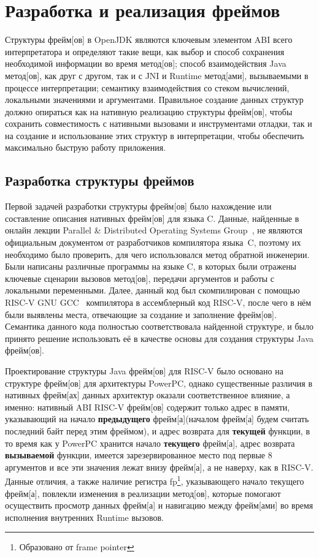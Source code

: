 \section{Разработка и реализация фреймов}

Структуры \gls{фрейм}[ов] в OpenJDK являются ключевым элементом ABI всего интерпретатора и определяют такие вещи, как выбор и способ сохранения необходимой информации во время  \gls{метод}[ов]; способ взаимодействия Java \gls{метод}[ов], как друг с другом, так и с JNI и Runtime \gls{метод}[ами], вызываемыми в процессе интерпретации; семантику взаимодействия со стеком вычислений, локальными значениями и аргументами. Правильное создание данных структур должно опираться как на нативную реализацию структуры \gls{фрейм}[ов], чтобы сохранить совместимость с нативными вызовами и инструментами отладки, так и на создание и использование этих структур в интерпретации, чтобы обеспечить максимально быструю работу приложения.


\subsection{Разработка структуры фреймов}

Первой задачей разработки структуры \gls{фрейм}[ов] было нахождение или составление описания нативных \gls{фрейм}[ов] для языка C. Данные, найденные в онлайн лекции Parallel \& Distributed Operating Systems Group~\cite{lecture:frames}, не являются официальным документом от разработчиков компилятора языка~C, поэтому их необходимо было проверить, для чего использовался \gls{метод} обратной инженерии. Были написаны различные программы на языке C, в которых были отражены ключевые сценарии вызовов \gls{метод}[ов], передачи аргументов и работы с локальными переменными. Далее, данный код был скомпилирован с помощью RISC-V GNU GCC~\cite{riscv:gnu} компилятора в ассемблерный код RISC-V, после чего в нём были выявлены места, отвечающие за создание и заполнение \gls{фрейм}[ов]. Семантика данного кода полностью соответствовала найденной структуре, и было принято решение использовать её в качестве основы для создания структуры Java \gls{фрейм}[ов]. 

Проектирование структуры Java \gls{фрейм}[ов] для RISC-V было основано на структуре \gls{фрейм}[ов] для архитектуры PowerPC, однако существенные различия в нативных \gls{фрейм}[ах] данных архитектур оказали соответственное влияние, а именно: нативный ABI RISC-V \gls{фрейм}[ов] содержит только адрес в памяти, указывающий на начало \textbf{предыдущего} \gls{фрейм}[а](началом \gls{фрейм}[а] будем считать последний байт перед этим фреймом), и адрес возврата для \textbf{текущей} функции, в то время как у PowerPC хранится начало \textbf{текущего} \gls{фрейм}[а], адрес возврата \textbf{вызываемой} функции, имеется зарезервированное место под первые 8 аргументов и все эти значения лежат внизу \gls{фрейм}[а], а не наверху, как в RISC-V.
Данные отличия, а также наличие регистра fp\footnote{Образовано от frame pointer}, указывающего начало текущего \gls{фрейм}[а], повлекли изменения в реализации \gls{метод}[ов], которые помогают осуществить просмотр данных \gls{фрейм}[а] и навигацию между \gls{фрейм}[ами] во время исполнения внутренних Runtime вызовов.

